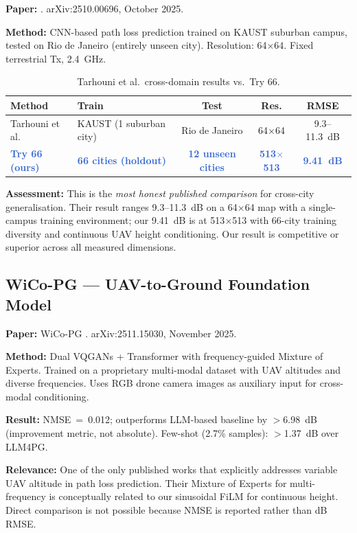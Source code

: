 \documentclass[11pt,a4paper]{article}
\newcommand{\ours}[1]{\textcolor{highlight}{\textbf{#1}}}
\begin{document}
\textbf{Paper:} \cite{tarhouni2025}. arXiv:2510.00696, October 2025.

\textbf{Method:} CNN-based path loss prediction trained on KAUST suburban campus,
tested on Rio de Janeiro (entirely unseen city). Resolution: 64$\times$64.
Fixed terrestrial Tx, 2.4~GHz.

\begin{table}[h!]
\centering
\caption{Tarhouni et al.\ cross-domain results vs.\ Try 66.}
\label{tab:tarhouni}
\begin{tabularx}{\textwidth}{lXccc}
\toprule
\textbf{Method} & \textbf{Train} & \textbf{Test} & \textbf{Res.} & \textbf{RMSE} \\
\midrule
Tarhouni et al. & KAUST (1 suburban city) & Rio de Janeiro & 64$\times$64 & 9.3--11.3~dB \\
\ours{Try 66 (ours)} & \ours{66 cities (holdout)} & \ours{12 unseen cities} & \ours{513$\times$513} & \ours{9.41~dB} \\
\bottomrule
\end{tabularx}
\end{table}

\textbf{Assessment:} This is the \emph{most honest published comparison} for
cross-city generalisation. Their result ranges 9.3--11.3~dB on a 64$\times$64 map
with a single-campus training environment; our 9.41~dB is at 513$\times$513 with
66-city training diversity and continuous UAV height conditioning. Our result is
competitive or superior across all measured dimensions.

\subsection{WiCo-PG --- UAV-to-Ground Foundation Model}

\textbf{Paper:} WiCo-PG \cite{wicopg2025}. arXiv:2511.15030, November 2025.

\textbf{Method:} Dual VQGANs + Transformer with frequency-guided Mixture of Experts.
Trained on a proprietary multi-modal dataset with UAV altitudes and diverse frequencies.
Uses RGB drone camera images as auxiliary input for cross-modal conditioning.

\textbf{Result:} NMSE~=~0.012; outperforms LLM-based baseline by $>$6.98~dB
(improvement metric, not absolute). Few-shot (2.7\% samples): $>$1.37~dB
over LLM4PG.

\textbf{Relevance:} One of the only published works that explicitly addresses
variable UAV altitude in path loss prediction. Their Mixture of Experts for
multi-frequency is conceptually related to our sinusoidal FiLM for continuous height.
Direct comparison is not possible because NMSE is reported rather than dB RMSE.
\end{document}
